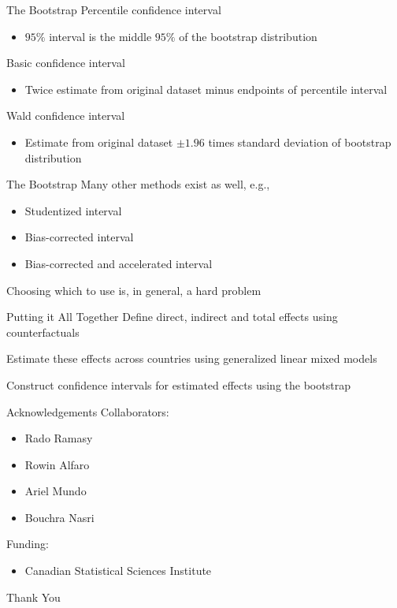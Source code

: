 \documentclass[14pt]{beamer}
\begin{document}
\begin{frame}{The Bootstrap}
    Percentile confidence interval
    \begin{itemize}
        \item $95\%$ interval is the middle $95\%$ of the bootstrap distribution \newline
    \end{itemize}

    Basic confidence interval
    \begin{itemize}
        \item Twice estimate from original dataset minus endpoints of percentile interval \newline
    \end{itemize}

    Wald confidence interval
    \begin{itemize}
        \item Estimate from original dataset $\pm 1.96$ times standard deviation of bootstrap distribution
    \end{itemize}
\end{frame}

\begin{frame}{The Bootstrap}
    Many other methods exist as well, e.g.,
    \begin{itemize}
        \item Studentized interval
        \item Bias-corrected interval
        \item Bias-corrected and accelerated interval \newline
    \end{itemize}

    Choosing which to use is, in general, a hard problem
\end{frame}

\begin{frame}{Putting it All Together}
    Define direct, indirect and total effects using counterfactuals \newline

    Estimate these effects across countries using generalized linear mixed models \newline

    Construct confidence intervals for estimated effects using the bootstrap
\end{frame}

\begin{frame}{Acknowledgements}
    Collaborators:
    \begin{itemize}
        \item Rado Ramasy
        \item Rowin Alfaro
        \item Ariel Mundo
        \item Bouchra Nasri \newline
    \end{itemize}

    Funding:
    \begin{itemize}
        \item Canadian Statistical Sciences Institute
    \end{itemize}
\end{frame}

\begin{frame}
    \centering
    \Huge Thank You
\end{frame}
\end{document}
